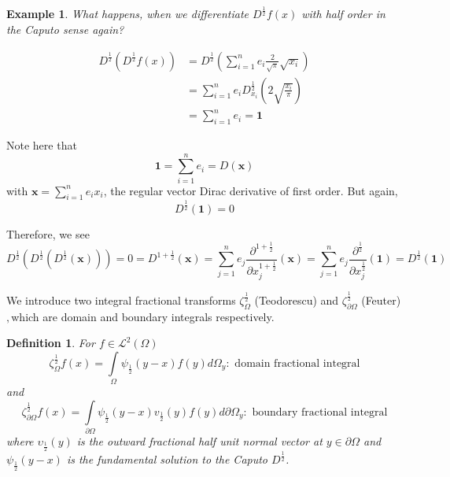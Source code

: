 \documentclass{amsart}%
\theoremstyle{plain}
\newtheorem{definition}{Definition}
\newtheorem{example}{Example}
\numberwithin{equation}{section}
\begin{document}
\begin{example}
What happens, when we differentiate $D^{\frac{1}{2}}f(x)$ with half order in
the Caputo sense again?%

\begin{align*}
D^{\frac{1}{2}}(D^{\frac{1}{2}}f(x))  & =D^{\frac{1}{2}}\left(
{\displaystyle\sum\limits_{i=1}^{n}}
e_{i}\frac{2}{\sqrt{\pi}}\sqrt{x_{i}}\right) \\
& =%
{\displaystyle\sum\limits_{i=1}^{n}}
e_{i}D_{x_{i}}^{\frac{1}{2}}\left(  2\sqrt{\frac{x_{i}}{\pi}}\right) \\
& =%
{\displaystyle\sum\limits_{i=1}^{n}}
e_{i}=\mathbf{1}%
\end{align*}

\end{example}

Note here that
\[
\mathbf{1=}%
{\displaystyle\sum\limits_{i=1}^{n}}
e_{i}=D\left(  \mathbf{x}\right)
\]
with $\mathbf{x}=%
{\displaystyle\sum\limits_{i=1}^{n}}
e_{i}x_{i}$, the regular vector Dirac derivative of first order. But again,%
\[
D^{\frac{1}{2}}\left(  \mathbf{1}\right)  =0
\]


Therefore, we see
\[
D^{\frac{1}{2}}\left(  D^{\frac{1}{2}}\left(  D^{\frac{1}{2}}\left(
\mathbf{x}\right)  \right)  \right)  =0=D^{1+\frac{1}{2}}\left(
\mathbf{x}\right)  =%
{\displaystyle\sum\limits_{j=1}^{n}}
e_{j}\frac{\partial^{1+\frac{1}{2}}}{\partial x_{j}^{1+\frac{1}{2}}}\left(
\mathbf{x}\right)  =%
{\displaystyle\sum\limits_{j=1}^{n}}
e_{j}\frac{\partial^{\frac{1}{2}}}{\partial x_{j}^{\frac{1}{2}}}\left(
\mathbf{1}\right)  =D^{\frac{1}{2}}\left(  \mathbf{1}\right)
\]


We introduce two integral fractional transforms $\zeta_{\Omega}^{\frac{1}{2}}$
(Teodorescu) and $\zeta_{\partial\Omega}^{\frac{1}{2}}$ (Feuter)$,$which are
domain and boundary integrals respectively.

\begin{definition}
For $f\in%
\mathcal{L}%
^{2}\left(  \Omega\right)  $%
\[
\zeta_{\Omega}^{\frac{1}{2}}f(x)=%
{\displaystyle\int\limits_{\Omega}}
\psi_{\frac{1}{2}}(y-x)f(y)d\Omega_{y}:\text{ domain fractional integral}%
\]
and
\[
\zeta_{\partial\Omega}^{\frac{1}{2}}f(x)=%
{\displaystyle\int\limits_{\partial\Omega}}
\psi_{\frac{1}{2}}(y-x)v_{\frac{1}{2}}\left(  y\right)  f(y)d\partial
\Omega_{y}:\text{ boundary fractional integral}%
\]
where $\upsilon_{\frac{1}{2}}\left(  y\right)  $ is the outward fractional
half unit normal vector at $y\in\partial\Omega$ and $\psi_{\frac{1}{2}}(y-x)$
is the fundamental solution to the Caputo $D^{\frac{1}{2}}$.
\end{definition}
\end{document}
